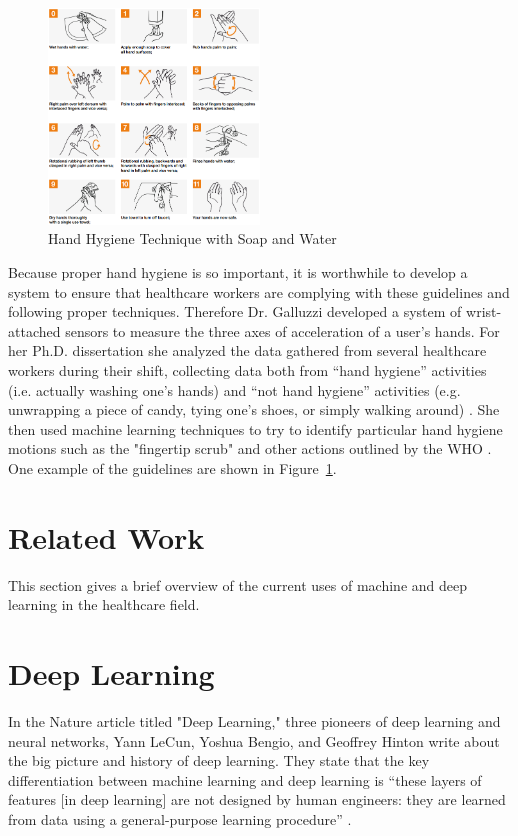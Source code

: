 \documentclass[]{report}
\begin{document}
\begin{figure}
	\centering
	\includegraphics[width=0.5\textwidth]{../images/handhygiene-summary}
	\caption{Hand Hygiene Technique with Soap and Water \cite{who2}}
	\label{hh-guidelines}
\end{figure}

Because proper hand hygiene is so important, it is worthwhile to develop a system to ensure that healthcare workers are complying with these guidelines and following proper techniques. Therefore Dr. Galluzzi developed a system of wrist-attached sensors to measure the three axes of acceleration of a user's hands. For her Ph.D. dissertation she analyzed the data gathered from several healthcare workers during their shift, collecting data both from ``hand hygiene'' activities (i.e. actually washing one's hands) and ``not hand hygiene'' activities (e.g. unwrapping a piece of candy, tying one's shoes, or simply walking around) \cite{Galluzzi}. She then used machine learning techniques to try to identify particular hand hygiene motions such as the "fingertip scrub" and other actions outlined by the WHO \cite{Galluzzi}. One example of the guidelines are shown in Figure~\ref{hh-guidelines}.




\section{Related Work}

This section gives a brief overview of the current uses of machine and deep learning in the healthcare field.


\section{Deep Learning}

In the Nature article titled "Deep Learning," three pioneers of deep learning and neural networks, Yann LeCun, Yoshua Bengio, and Geoffrey Hinton write about the big picture and history of deep learning. They state that the key differentiation between machine learning and deep learning is ``these layers of features [in deep learning] are not designed by human engineers: they are learned from data using a general-purpose learning procedure'' \cite{ThreeGiants}. 
\end{document}
